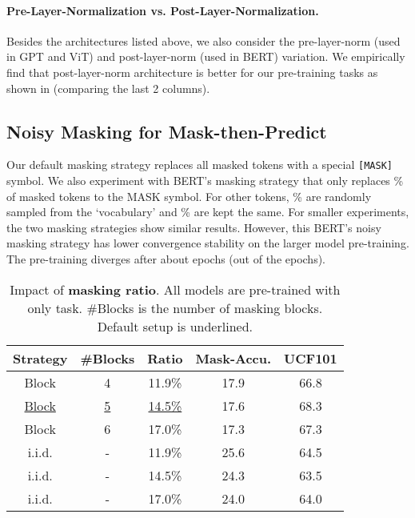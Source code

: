 \paragraph{Pre-Layer-Normalization vs. Post-Layer-Normalization.}
Besides the architectures listed above, we also consider the pre-layer-norm (used in GPT and ViT) and post-layer-norm (used in BERT) variation. 
We empirically find that post-layer-norm architecture is better for our pre-training tasks as shown in  (comparing the last 2 columns).


\subsection{Noisy Masking for Mask-then-Predict}

Our default masking strategy replaces all masked tokens with a special \texttt{[MASK]} symbol.
We also experiment with BERT's masking strategy that only replaces \% of masked tokens to the MASK symbol. 
For other tokens, \% are randomly sampled from the `vocabulary' and \% are kept the same.
For smaller experiments, the two masking strategies show similar results. 
However, this BERT's noisy masking strategy has lower convergence stability on the larger model pre-training.
The pre-training diverges after about  epochs (out of the  epochs).



\begin{table}[t]
\centering
\caption{
Impact of \textbf{masking ratio}. All models are pre-trained with only \ourmask task. 
\#Blocks is the number of masking blocks.
Default setup is underlined. 
}
\begin{tabular}{@{}c|cc|cc@{}}
\toprule
Strategy & \#Blocks & Ratio & Mask-Accu.                  & UCF101          \\ \midrule
Block            & 4              & 11.9\%        &  17.9                       & 66.8            \\
\underline{Block}            & \underline{5}              & \underline{14.5\%}        &  17.6                       & 68.3           \\
Block            & 6              & 17.0\%        &  17.3                       & 67.3            \\ 
i.i.d.           & -              & 11.9\%        &  25.6                       & 64.5                \\
i.i.d.           & -              & 14.5\%        &  24.3                       & 63.5           \\
i.i.d.           & -              & 17.0\%        &  24.0                       & 64.0           \\ \bottomrule
\end{tabular}\label{tab:appen_masking_ratio}
\end{table}

